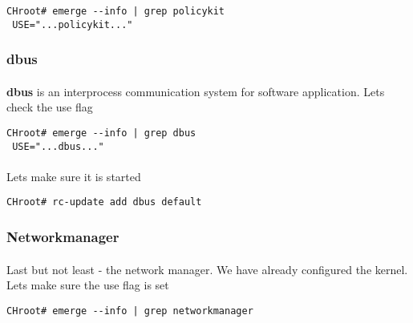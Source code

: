 \documentclass[10pt,a4paper]{article}
\begin{document}
                    \begin{lstlisting}[style=BashInputCHRoot]
 CHroot# emerge --info | grep policykit
 USE="...policykit..."
                    \end{lstlisting}
                
                \newpage
                \subsubsection{dbus}
                    
                    \paragraph{} \textbf{dbus} is an interprocess communication system for software application. Lets check the use flag
                    
                    \begin{lstlisting}[style=BashInputCHRoot]
 CHroot# emerge --info | grep dbus
 USE="...dbus..."
                    \end{lstlisting}
                    
                    \paragraph{} Lets make sure it is started
                    
                    \begin{lstlisting}[style=BashInputCHRoot]
 CHroot# rc-update add dbus default
                    \end{lstlisting}
                    
                \newpage
                \subsubsection{Networkmanager}

                    \paragraph{} Last but not least - the network manager. We have already configured the kernel. Lets make sure the use flag is set
                    
                    \begin{lstlisting}[style=BashInputCHRoot]
 CHroot# emerge --info | grep networkmanager
                    \end{lstlisting}
                    
\end{document}
